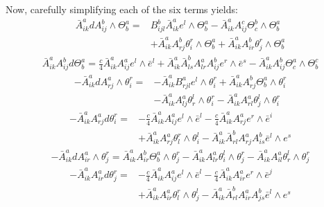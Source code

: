 \documentclass[11pt]{amsart}
\theoremstyle{definition}
\begin{document}
Now, carefully simplifying each of the six terms yields:
%
\begin{align*}
\bar{A}^a_{ik} d A^b_{ij} \wedge \Theta^a_b =& B^b_{ijl} \bar{A}^a_{ik} e^l \wedge \Theta^a_b - \bar{A}^a_{ik} A^c_{ij} \Theta^b_c \wedge \Theta^a_b\\
&+ \bar{A}^a_{ik} A^b_{rj} \theta^r_i \wedge \Theta^a_b + \bar{A}^a_{ik} A^b_{ir} \theta^r_j \wedge \Theta^a_b
\end{align*}
%
\begin{align*}
\bar{A}^a_{ik} A^b_{ij} d \Theta^a_b = \frac{c}{4} \bar{A}^a_{ik} A^a_{ij} e^l \wedge \bar{e}^l + \bar{A}^a_{ik} \bar{A}^b_{ls} A^a_{lr} A^b_{ij} e^r \wedge \bar{e}^s - \bar{A}^a_{ik} A^b_{ij} \Theta^a_c \wedge \Theta^c_b
\end{align*}
%
\begin{align*}
- \bar{A}^a_{ik} d A^a_{rj} \wedge \theta^r_i =& - \bar{A}^a_{ik} B^a_{rjl} e^l \wedge \theta^r_i + \bar{A}^a_{ik} A^b_{rj} \Theta^a_b \wedge \theta^r_i \\
&- \bar{A}^a_{ik} A^a_{lj} \theta^l_r \wedge \theta^r_i - \bar{A}^a_{ik} A^a_{rl} \theta^l_j \wedge \theta^r_i
\end{align*}
%
\begin{align*}
- \bar{A}^a_{ik} A^a_{rj} d \theta^r_i =& - \frac{c}{4} \bar{A}^a_{ik} A^a_{ij} e^l \wedge \bar{e}^l - \frac{c}{4} \bar{A}^a_{ik} A^a_{rj} e^r \wedge \bar{e}^i \\
&+ \bar{A}^a_{ik} A^a_{rj} \theta^r_l \wedge \theta^l_i - \bar{A}^a_{ik} \bar{A}^b_{rl} A^a_{rj} A^b_{is} \bar{e}^l \wedge e^s
\end{align*}
%
\begin{align*}
- \bar{A}^a_{ik} d A^a_{ir} \wedge \theta^r_j = \bar{A}^a_{ik} A^b_{ir} \Theta^a_b \wedge \theta^r_j - \bar{A}^a_{ik} A^a_{lr} \theta^l_i \wedge \theta^r_j - \bar{A}^a_{ik} A^a_{il} \theta^l_r \wedge \theta^r_j
\end{align*}
%
\begin{align*}
- \bar{A}^a_{ik} A^a_{ir} d \theta^r_j =& - \frac{c}{4} \bar{A}^a_{ik} A^a_{ij} e^l \wedge \bar{e}^l - \frac{c}{4} \bar{A}^a_{ik} A^a_{ir} e^r \wedge \bar{e}^j  \\
&+ \bar{A}^a_{ik} A^a_{ir} \theta^r_l \wedge \theta^l_j - \bar{A}^a_{ik} \bar{A}^b_{rl} A^a_{ir} A^b_{js} \bar{e}^l \wedge e^s
\end{align*}
\end{document}
